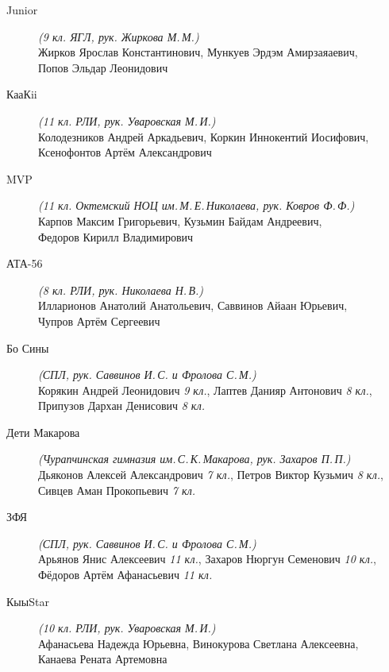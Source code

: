 \begin{description}
\item[Junior] \textit{(9 кл. ЯГЛ, рук. Жиркова М.\,М.)} \\
Жирков Ярослав Константинович, Мункуев Эрдэм Амирзаяаевич, \\
Попов Эльдар Леонидович

\item[КааКii] \textit{(11 кл. РЛИ, рук. Уваровская М.\,И.)} \\
Колодезников Андрей Аркадьевич, Коркин Иннокентий Иосифович, \\
Ксенофонтов Артём Александрович

\item[MVP] \textit{(11 кл. Октемский НОЦ им.\,М.\,Е.\,Николаева, рук. Ковров Ф.\,Ф.)} \\
Карпов Максим Григорьевич, Кузьмин Байдам Андреевич, \\
Федоров Кирилл Владимирович

\item[АТА-56] \textit{(8 кл. РЛИ, рук. Николаева Н.\,В.)} \\
Илларионов Анатолий Анатольевич, Саввинов Айаан Юрьевич, \\
Чупров Артём Сергеевич

\item[Бо Сины] \textit{(СПЛ, рук. Саввинов И.\,С. и Фролова С.\,М.)} \\
Корякин Андрей Леонидович \textit{9 кл.}, Лаптев Данияр Антонович \textit{8 кл.}, \\
Припузов Дархан Денисович \textit{8 кл.}

\item[Дети Макарова] \textit{(Чурапчинская гимназия им.\,С.\,К.\,Макарова, рук. Захаров П.\,П.)} \\
Дьяконов Алексей Александрович \textit{7 кл.}, Петров Виктор Кузьмич \textit{8 кл.}, \\
Сивцев Аман Прокопьевич \textit{7 кл.}

\item[ЗФЯ] \textit{(СПЛ, рук. Саввинов И.\,С. и Фролова С.\,М.)} \\
Арьянов Янис Алексеевич \textit{11 кл.}, Захаров Нюргун Семенович \textit{10 кл.}, \\
Фёдоров Артём Афанасьевич \textit{11 кл.}

\item[КыыStar] \textit{(10 кл. РЛИ, рук. Уваровская М.\,И.)} \\
Афанасьева Надежда Юрьевна, Винокурова Светлана Алексеевна, \\
Канаева Рената Артемовна


\end{description}
